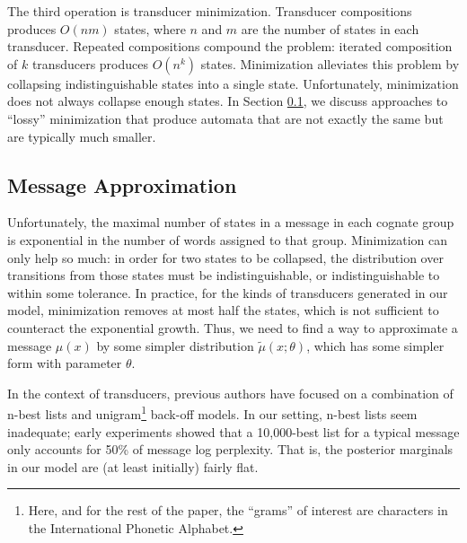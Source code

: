 \documentclass[11pt,a4paper]{article}
\begin{document}
The third operation is transducer minimization. Transducer compositions
produces $O(nm)$ states, where $n$ and $m$ are the number of states
in each transducer. Repeated compositions compound the problem:
iterated composition of $k$ transducers produces $O(n^k)$ states.
Minimization alleviates this problem by collapsing indistinguishable
states into a single state. Unfortunately, minimization does not
always collapse enough states. In Section \ref{sec:approx}, we discuss approaches
to ``lossy'' minimization that produce automata that are not exactly
the same but are typically much smaller.

\subsection{Message Approximation}
\label{sec:approx}

Unfortunately, the maximal number of states in a message in each
cognate group is exponential in the number of words assigned to
that group. Minimization can only help so much: in order for two
states to be collapsed, the distribution over transitions from those
states must be indistinguishable, or indistinguishable to within
some tolerance. In practice, for the kinds of transducers generated
in our model, minimization removes at most half the states, which
is not sufficient to counteract the exponential growth. Thus, we
need to find a way to approximate a message $\mu(x)$ by some simpler
distribution $\tilde\mu(x;\theta)$, which has some simpler form with
parameter $\theta$.

In the context of transducers, previous authors have focused on a
combination of n-best lists and unigram\footnote{Here, and for the
rest of the paper, the ``grams'' of interest are characters in the
International Phonetic Alphabet.} back-off models. \cite{dreyer2009graphical}
In our setting, n-best lists seem inadequate; early experiments
showed that a 10,000-best list for a typical message only accounts
for 50\% of message log perplexity. That is, the posterior marginals in
our model are (at least initially) fairly flat.
\end{document}
